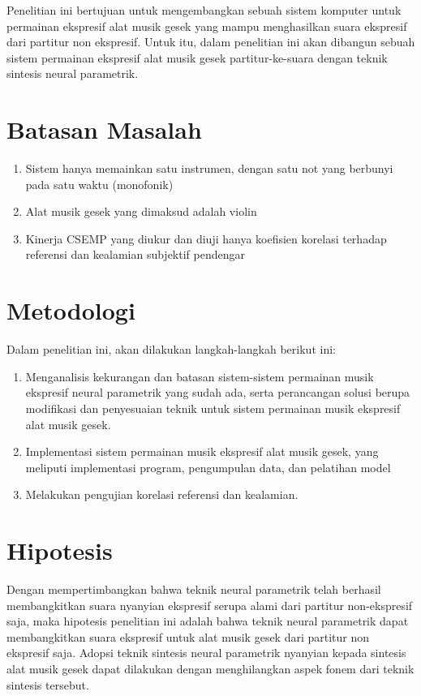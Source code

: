 Penelitian ini bertujuan untuk mengembangkan sebuah sistem komputer untuk permainan ekspresif alat musik gesek yang mampu menghasilkan suara ekspresif dari partitur non ekspresif. Untuk itu, dalam penelitian ini akan dibangun sebuah sistem permainan ekspresif alat musik gesek partitur-ke-suara dengan teknik sintesis neural parametrik.

\section{Batasan Masalah}

\begin{enumerate}
	\item Sistem hanya memainkan satu instrumen, dengan satu not yang berbunyi pada satu waktu (monofonik)
	\item Alat musik gesek yang dimaksud adalah violin
	\item Kinerja CSEMP yang diukur dan diuji hanya koefisien korelasi terhadap referensi dan kealamian subjektif pendengar
\end{enumerate}

\section{Metodologi} \label{methodology}

Dalam penelitian ini, akan dilakukan langkah-langkah berikut ini:
\begin{enumerate}
	\item Menganalisis kekurangan dan batasan sistem-sistem permainan musik ekspresif neural parametrik yang sudah ada, serta perancangan solusi berupa modifikasi dan penyesuaian teknik untuk sistem permainan musik ekspresif alat musik gesek.
	\item Implementasi sistem permainan musik ekspresif alat musik gesek, yang meliputi implementasi program, pengumpulan data, dan pelatihan model
	\item Melakukan pengujian korelasi referensi dan kealamian.
\end{enumerate}

\section{Hipotesis}

Dengan mempertimbangkan bahwa teknik neural parametrik telah berhasil membangkitkan suara nyanyian ekspresif serupa alami dari partitur non-ekspresif saja, maka hipotesis penelitian ini adalah bahwa teknik neural parametrik dapat membangkitkan suara ekspresif untuk alat musik gesek dari partitur non ekspresif saja. Adopsi teknik sintesis neural parametrik nyanyian kepada sintesis alat musik gesek dapat dilakukan dengan menghilangkan aspek fonem dari teknik sintesis tersebut.
